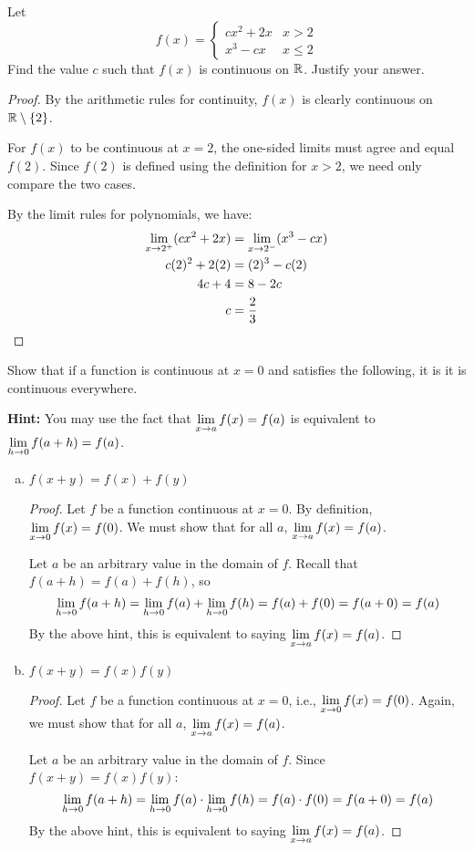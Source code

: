 \documentclass{agony}
\begin{document}
\question Let
\begin{equation*}
  f(x) = \begin{cases}
    cx^2+2x & x > 2    \\
    x^3-cx  & x \leq 2
  \end{cases}
\end{equation*}
Find the value $c$ such that $f(x)$ is continuous on $\mathbb{R}$. Justify your answer.
\begin{proof}
  By the arithmetic rules for continuity, $f(x)$ is clearly continuous on $\mathbb{R} \setminus \{2\}$.

  For $f(x)$ to be continuous at $x=2$, the one-sided limits must agree and equal $f(2)$.
  Since $f(2)$ is defined using the definition for $x > 2$, we need only compare the two cases.

  By the limit rules for polynomials, we have:
  \begin{align*}
    \lim\limits_{x\to2^+} (cx^2+2x) & = \lim\limits_{x\to2^-}(x^3-cx) \\
    c(2)^2+2(2)             & = (2)^3-c(2)            \\
    4c+4                    & = 8-2c                  \\
    c                       & = \frac{2}{3} \qedhere
  \end{align*}
\end{proof}

\question Show that if a function is continuous at $x=0$ and satisfies the following, it is it is continuous everywhere.

\textbf{Hint:} You may use the fact that $\lim\limits_{x\to a}f(x)=f(a)$ is equivalent to $\lim\limits_{h\to0}f(a+h)=f(a)$.
\begin{enumerate}[(a)]
  \item $f(x+y)=f(x)+f(y)$
        \begin{proof}
          Let $f$ be a function continuous at $x=0$.
          By definition, $\lim\limits_{x\to0}f(x)=f(0)$.
          We must show that for all $a$, $\lim\limits_{x\to a} f(x) = f(a)$.

          Let $a$ be an arbitrary value in the domain of $f$.
          Recall that $f(a+h) = f(a)+f(h)$, so
          \[ \lim\limits_{h\to0}f(a+h) = \lim\limits_{h\to0}f(a) + \lim\limits_{h\to0}f(h) = f(a) + f(0) = f(a+0) = f(a) \]
          By the above hint, this is equivalent to saying $\lim\limits_{x\to a}f(x)=f(a)$.
        \end{proof}
  \item $f(x+y)=f(x)f(y)$
        \begin{proof}
          Let $f$ be a function continuous at $x=0$, i.e., $\lim\limits_{x\to0}f(x)=f(0)$.
          Again, we must show that for all $a$, $\lim\limits_{x\to a} f(x) = f(a)$.

          Let $a$ be an arbitrary value in the domain of $f$.
          Since $f(x+y)=f(x)f(y)$:
          \[ \lim\limits_{h\to0} f(a+h) = \lim\limits_{h\to0} f(a) \cdot \lim\limits_{h\to0} f(h) = f(a) \cdot f(0) = f(a+0) = f(a) \]
          By the above hint, this is equivalent to saying $\lim\limits_{x\to a}f(x)=f(a)$.
        \end{proof}
\end{enumerate}
\end{document}
